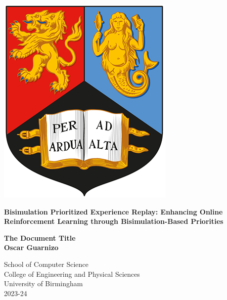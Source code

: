 
\thispagestyle{empty}

\begin{spacing}{2}
	\begin{center}
		\includegraphics[scale = 1.5]{Preamble/BirmCrest.png}
	\end{center}
	\vspace{10mm}
	\begin{center}
		\textbf{\Large Bisimulation Prioritized Experience Replay: Enhancing Online Reinforcement Learning through Bisimulation-Based Priorities}
		\vspace{10mm}
	\end{center}
	\begin{center}
		\textbf{\large The Document Title}
		\vspace{20mm}
		\\\textbf{\Large Oscar Guarnizo}
		\vspace{20mm}
	\end{center}
	\begin{center}
		{\large School of Computer Science}
		\\ {\large College of Engineering and Physical Sciences}
		\\ {\large University of Birmingham}
		\\ {\large 2023-24}
	\end{center}
\end{spacing}


